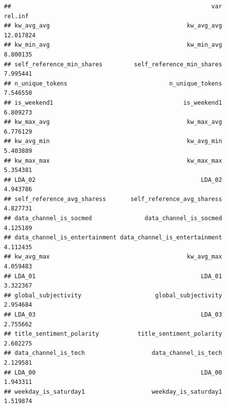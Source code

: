 \documentclass[]{article}
\newenvironment{Shaded}{\begin{snugshade}}{\end{snugshade}}
\newcommand{\DataTypeTok}[1]{\textcolor[rgb]{0.13,0.29,0.53}{#1}}
\newcommand{\KeywordTok}[1]{\textcolor[rgb]{0.13,0.29,0.53}{\textbf{#1}}}
\newcommand{\NormalTok}[1]{#1}
\newcommand{\OperatorTok}[1]{\textcolor[rgb]{0.81,0.36,0.00}{\textbf{#1}}}
\newcommand{\StringTok}[1]{\textcolor[rgb]{0.31,0.60,0.02}{#1}}
\begin{document}
\begin{verbatim}
##                                                         var   rel.inf
## kw_avg_avg                                       kw_avg_avg 12.017824
## kw_min_avg                                       kw_min_avg  8.800135
## self_reference_min_shares         self_reference_min_shares  7.995441
## n_unique_tokens                             n_unique_tokens  7.546550
## is_weekend1                                     is_weekend1  6.809273
## kw_max_avg                                       kw_max_avg  6.776129
## kw_avg_min                                       kw_avg_min  5.403889
## kw_max_max                                       kw_max_max  5.354381
## LDA_02                                               LDA_02  4.943786
## self_reference_avg_sharess       self_reference_avg_sharess  4.827731
## data_channel_is_socmed               data_channel_is_socmed  4.125189
## data_channel_is_entertainment data_channel_is_entertainment  4.112435
## kw_avg_max                                       kw_avg_max  4.059483
## LDA_01                                               LDA_01  3.322367
## global_subjectivity                     global_subjectivity  2.954684
## LDA_03                                               LDA_03  2.755662
## title_sentiment_polarity           title_sentiment_polarity  2.602275
## data_channel_is_tech                   data_channel_is_tech  2.129581
## LDA_00                                               LDA_00  1.943311
## weekday_is_saturday1                   weekday_is_saturday1  1.519874
\end{verbatim}

\begin{Shaded}
\end{Shaded}
\end{document}
